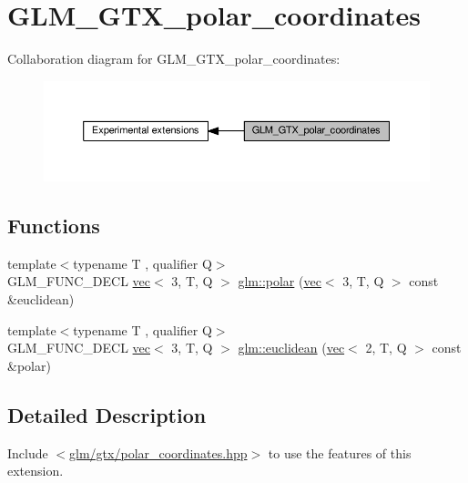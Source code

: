 \hypertarget{group__gtx__polar__coordinates}{}\section{G\+L\+M\+\_\+\+G\+T\+X\+\_\+polar\+\_\+coordinates}
\label{group__gtx__polar__coordinates}
Collaboration diagram for G\+L\+M\+\_\+\+G\+T\+X\+\_\+polar\+\_\+coordinates\+:
\nopagebreak
\begin{figure}[H]
\begin{center}
\leavevmode
\includegraphics[width=350pt]{d4/d30/group__gtx__polar__coordinates}
\end{center}
\end{figure}
\subsection*{Functions}
\begin{DoxyCompactItemize}
\item 
{\footnotesize template$<$typename T , qualifier Q$>$ }\\G\+L\+M\+\_\+\+F\+U\+N\+C\+\_\+\+D\+E\+CL \hyperlink{structglm_1_1vec}{vec}$<$ 3, T, Q $>$ \hyperlink{group__gtx__polar__coordinates_gab83ac2c0e55b684b06b6c46c28b1590d}{glm\+::polar} (\hyperlink{structglm_1_1vec}{vec}$<$ 3, T, Q $>$ const \&euclidean)
\item 
{\footnotesize template$<$typename T , qualifier Q$>$ }\\G\+L\+M\+\_\+\+F\+U\+N\+C\+\_\+\+D\+E\+CL \hyperlink{structglm_1_1vec}{vec}$<$ 3, T, Q $>$ \hyperlink{group__gtx__polar__coordinates_ga1821d5b3324201e60a9e2823d0b5d0c8}{glm\+::euclidean} (\hyperlink{structglm_1_1vec}{vec}$<$ 2, T, Q $>$ const \&polar)
\end{DoxyCompactItemize}


\subsection{Detailed Description}
Include $<$\hyperlink{polar__coordinates_8hpp}{glm/gtx/polar\+\_\+coordinates.\+hpp}$>$ to use the features of this extension.

